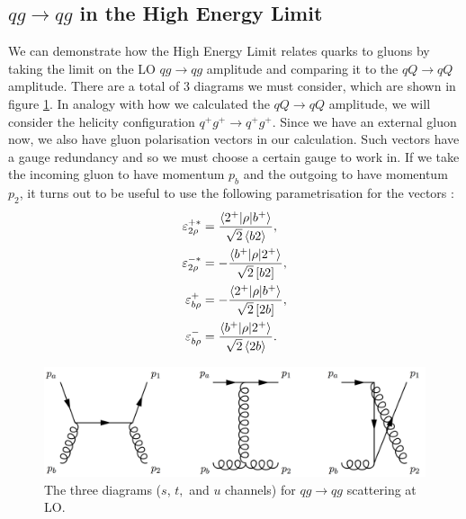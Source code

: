\subsection{$qg \to qg$ in the High Energy Limit}

We can demonstrate how the High Energy Limit relates quarks to gluons by taking the limit on the LO $qg \to qg$ amplitude and comparing it to the $qQ \to qQ$ amplitude. There are a total of 3 diagrams we must consider, which are shown in figure \ref{fig:qg_qg_scat}. In analogy with how we calculated the $qQ \to qQ$ amplitude, we will consider the helicity configuration $q^+ g^+ \to q^+ g^+$. Since we have an external gluon now, we also have gluon polarisation vectors in our calculation. Such vectors have a gauge redundancy and so we must choose a certain gauge to work in. If we take the incoming gluon to have momentum $p_b$ and the outgoing to have momentum $p_2$, it turns out to be useful to use the following parametrisation for the vectors \cite{Dixon1996, Andersen2010}:
\begin{subequations}
\begin{align}
\varepsilon_{2 \rho}^{+*} &= \frac{\mathinner{\langle2^+\vert\rho\vert b^+\rangle}_{}}{\sqrt{2} \left< b 2 \right>},\\
\varepsilon_{2 \rho}^{-*} &= -\frac{\mathinner{\langle b^+\vert\rho\vert2^+\rangle}_{}}{\sqrt{2} \left[ b 2 \right]}, \\
\varepsilon_{b \rho}^{+} &= -\frac{\mathinner{\langle2^+\vert\rho\vert b^+\rangle}_{}}{\sqrt{2} \left [ 2 b \right]}, \\
\varepsilon_{b \rho}^{-} &= \frac{\mathinner{\langle b^+\vert\rho\vert2^+\rangle}_{}}{\sqrt{2} \left< 2 b \right>}.
\end{align}
\end{subequations}

\begin{figure}[t]
\centering
\includegraphics[scale=0.25]{Images/qg_qg_scattering.png} 
\caption{The three diagrams ($s$, $t,$ and $u$ channels) for $qg \to qg$ scattering at LO.}
\label{fig:qg_qg_scat}
\end{figure}

